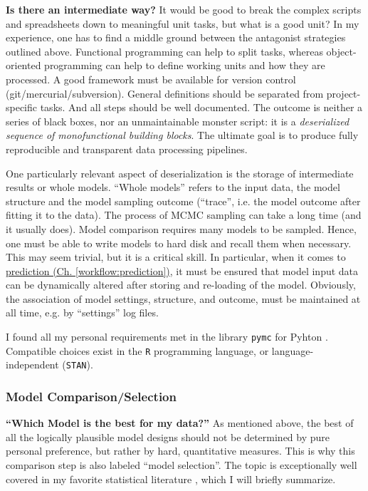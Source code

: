 \textbf{Is there an intermediate way?}
It would be good to break the complex scripts and spreadsheets down to meaningful unit tasks, but what is a good unit?
In my experience, one has to find a middle ground between the antagonist strategies outlined above.
Functional programming can help to split tasks, whereas object-oriented programming can help to define working units and how they are processed.
A good framework must be available for version control (git/mercurial/subversion).
General definitions should be separated from project-specific tasks.
And all steps should be well documented.
The outcome is neither a series of black boxes, nor an unmaintainable monster script: it is a \emph{deserialized sequence of monofunctional building blocks}.
The ultimate goal is to produce fully reproducible and transparent data processing pipelines.


One particularly relevant aspect of deserialization is the storage of intermediate results or whole models.
``Whole models'' refers to the input data, the model structure and the model sampling outcome (``trace'', i.e. the model outcome after fitting it to the data).
The process of MCMC sampling can take a long time (and it usually does).
Model comparison requires many models to be sampled.
Hence, one must be able to write models to hard disk and recall them when necessary.
This may seem trivial, but it is a critical skill.
In particular, when it comes to \hyperref[workflow:prediction]{prediction (Ch. \ref{workflow:prediction})}, it must be ensured that model input data can be dynamically altered after storing and re-loading of the model.
Obviously, the association of model settings, structure, and outcome, must be maintained at all time, e.g. by ``settings'' log files.


I found all my personal requirements met in the library \texttt{pymc} for Pyhton \citep{Salvatier2016}.
Compatible choices exist in the \texttt{R} programming language, or language-independent (\texttt{STAN}).


\subsubsection{Model Comparison/Selection}
\label{workflow:comparison}
\textbf{``Which Model is the best for my data?''}
As mentioned above, the best of all the logically plausible model designs should not be determined by pure personal preference, but rather by hard, quantitative measures.
This is why this comparison step is also labeled ``model selection''.
The topic is exceptionally well covered in my favorite statistical literature \citep[][Ch. 11 therein]{McElreath2018}, which I will briefly summarize.

